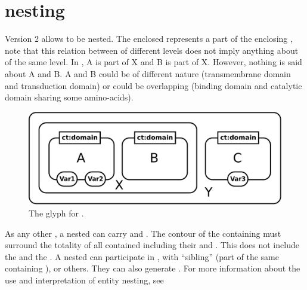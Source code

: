 
\section{ nesting }
\label{sec:domain}

\SBGNERLone Version 2 allows  to be nested. The enclosed  represents a part of the enclosing , note that this relation between  of different levels does not imply anything about  of the same level. In  , A is part of X and B is part of X. However, nothing is said about A and B. A and B could be of different nature (transmembrane domain and transduction domain) or could be overlapping (binding domain and catalytic domain sharing some amino-acids). 

\begin{figure}[H]
  \centering
  \includegraphics[scale = 0.3]{images/domain}
  \caption{The \ER glyph for .}
  \label{fig:domain}
\end{figure}

As any other , a nested  can carry  and . The contour of the containing  must surround the totality of all contained  including their  and . This does not include the  and the . A nested  can participate in , with ``sibling''  (part of the same containing ), or others. They can also generate . For more information about the use and interpretation of entity nesting, see  

